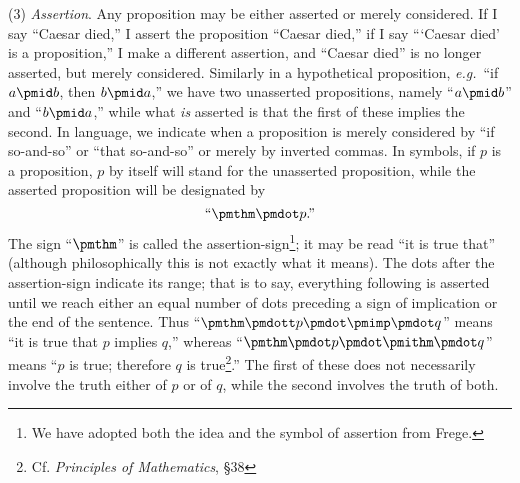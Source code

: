 (3) \textit{Assertion}. Any proposition may be either asserted or merely considered. If I say ``Caesar died,'' I assert the proposition ``Caesar died,'' if I say ```Caesar died' is a proposition,'' I make a different assertion, and ``Caesar died'' is no longer asserted, but merely considered. Similarly in a hypothetical proposition, \textit{e.g.}\ ``if $a \pmid b$, then $b \pmid a$,'' we have two unasserted propositions, namely ``$a \pmid b$'' and ``$b \pmid a$,'' while what \textit{is} asserted is that the first of these implies the second. In language, we indicate when a proposition is merely considered by ``if so-and-so'' or ``that so-and-so'' or merely by inverted commas. In symbols, if $p$ is a proposition, $p$ by itself will stand for the unasserted proposition, while the asserted proposition will be designated by
\[
\text{``}\pmthm\pmdot p\text{.''}
\]
The sign ``$\pmthm$'' is called the assertion-sign\footnote{We have adopted both the idea and the symbol of assertion from Frege.}; it may be read ``it is true that'' (although philosophically this is not exactly what it means). The dots after the assertion-sign indicate its range; that is to say, everything following is asserted until we reach either an equal number of dots preceding a sign of implication or the end of the sentence. Thus ``$\pmthm \pmdott p \pmdot \pmimp \pmdot q$'' means ``it is true that $p$ implies $q$,'' whereas ``$\pmthm \pmdot p \pmdot \pmithm \pmdot q$'' means ``$p$ is true; therefore $q$ is true\footnote{Cf. \textit{Principles of Mathematics}, \S38}.'' The first of these does not necessarily involve the truth either of $p$ or of $q$, while the second involves the truth of both.

